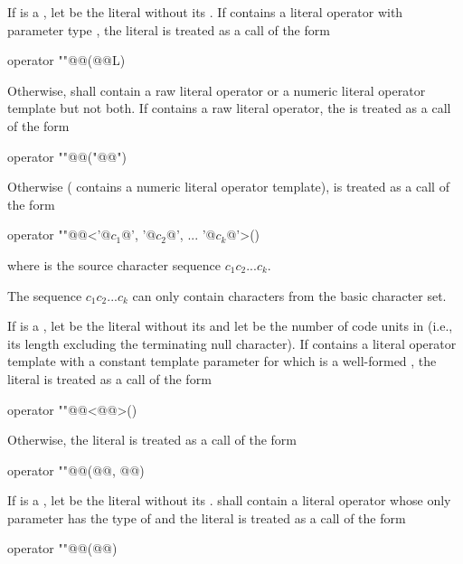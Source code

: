 \pnum
If  is a , let  be the
literal without its . If  contains a literal operator
with parameter type , the literal  is treated as a call of
the form
\begin{codeblock}
operator ""@@(@@L)
\end{codeblock}
Otherwise,  shall contain a raw literal operator
or a numeric literal operator template but not both.
If  contains a raw literal operator,
the   is treated as a call of the form
\begin{codeblock}
operator ""@@("@@")
\end{codeblock}
Otherwise ( contains a numeric literal operator template),
 is treated as a call of the form
\begin{codeblock}
operator ""@@<'@$c_1$@', '@$c_2$@', ... '@$c_k$@'>()
\end{codeblock}
where  is the source character sequence $c_1c_2...c_k$.
\begin{note}
The sequence
$c_1c_2...c_k$ can only contain characters from the basic character set.
\end{note}

\pnum
If  is a ,
let  be the literal without its 
and let  be the number of code units in 
(i.e., its length excluding the terminating null character).
If  contains a literal operator template with
a constant template parameter for which  is
a well-formed ,
the literal  is treated as a call of the form
\begin{codeblock}
operator ""@@<@@>()
\end{codeblock}
Otherwise, the literal  is treated as a call of the form
\begin{codeblock}
operator ""@@(@@, @@)
\end{codeblock}

\pnum
If  is a , let  be the
literal without its .
 shall contain a literal operator whose only parameter has
the type of  and the
literal  is treated as a call
of the form
\begin{codeblock}
operator ""@@(@@)
\end{codeblock}

